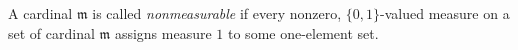 A cardinal $\mathfrak{m}$ is called \emph{nonmeasurable} if every nonzero, $\{0,1\}$-valued measure on a set of cardinal $\mathfrak{m}$ assigns measure $1$ to some one-element set.